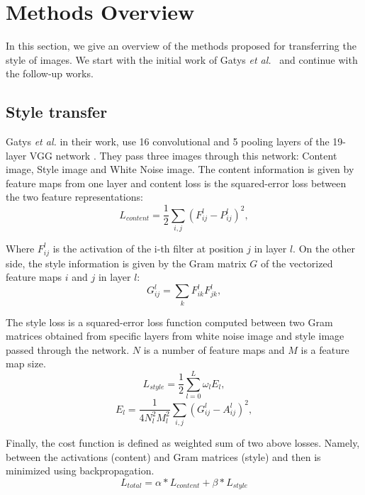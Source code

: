 \documentclass{llncs}
\begin{document}
\section{Methods Overview}

In this section, we give an overview of the methods proposed for transferring the style of images. We start with the initial work of Gatys {\it et al.}~\cite{gatys:} and continue with the follow-up works.

\subsection{Style transfer}
Gatys \textit{et al.} \cite{gatys:} in their work, use 16 convolutional and 5 pooling layers of the 19-layer VGG network \cite{vgg:}. They pass three images through this network: Content image, Style image and White Noise image. The content information is given by feature maps from one layer %
and content loss is the squared-error loss between the two feature representations:
\begin{equation}
  L_{content} = \frac{1}{2} \sum_{i,j} (F_{ij}^{l} - P_{ij}^{l})^2 ,
\end{equation}

Where $F_{ij}^{l}$ is the activation of the i-th filter at position $j$ in layer $l$. On the other side, the style information is given by the Gram matrix $G$ of the vectorized feature maps $i$ and $j$ in layer $l$:%
\begin{equation}
  G_{ij}^{l} = \sum_{k} F_{ik}^{l} F_{jk}^{l} ,
\end{equation}

The style loss is a squared-error loss function computed between two Gram matrices obtained from specific layers from white noise image and style image passed through the network. $N$ is a number of feature maps and $M$ is a feature map size.
\begin{equation}
  L_{style} = \frac{1}{2} \sum_{l=0}^L \omega_lE_l ,
\end{equation}
\begin{equation}
  E_{l} = \frac{1}{4N_l^2M_l^2} \sum_{i,j} (G_{ij}^{l} - A_{ij}^{l})^2 ,
\end{equation}

Finally, the cost function is defined as weighted sum of two above losses. Namely, between the activations (content) and Gram matrices (style) and then is minimized using backpropagation.
\begin{equation}
  L_{total} = \alpha*L_{content} + \beta*L_{style}
\end{equation}
\end{document}
